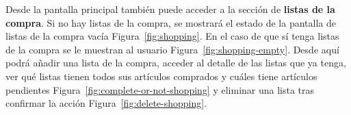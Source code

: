 Desde la pantalla principal también puede acceder a la sección de \textbf{listas de la compra}. Si no hay listas de la compra, se mostrará el estado de la pantalla de listas de la compra vacía Figura~\ref{fig:shopping}. En el caso de que sí tenga listas de la compra se le muestran al usuario Figura~\ref{fig:shopping-empty}. Desde aquí podrá añadir una lista de la compra, acceder al detalle de las listas que ya tenga, ver qué listas tienen todos sus artículos comprados y cuáles tiene artículos pendientes Figura~\ref{fig:complete-or-not-shopping} y eliminar una lista tras confirmar la acción Figura~\ref{fig:delete-shopping}.

\begin{figure}[H]
    \centering

    \begin{subfigure}[b]{0.3\textwidth}

\end{subfigure}
\end{figure}
